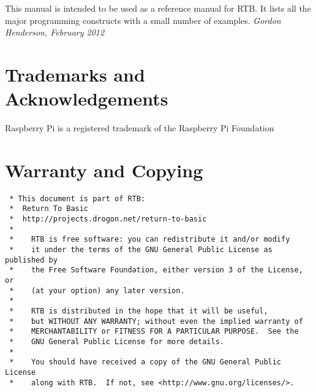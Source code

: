 This manual is intended to be used as a reference manual for RTB. It
lists all the major programming constructs with a small number of examples.
\vfill
{\hfill\em Gordon Henderson, February 2012}
\newpage
{}
\section*{Trademarks and Acknowledgements}
Raspberry Pi is a registered trademark of the Raspberry Pi Foundation


\section*{Warranty and Copying}
\begin{verbatim}
 * This document is part of RTB:
 *	Return To Basic
 *	http://projects.drogon.net/return-to-basic
 *
 *    RTB is free software: you can redistribute it and/or modify
 *    it under the terms of the GNU General Public License as published by
 *    the Free Software Foundation, either version 3 of the License, or
 *    (at your option) any later version.
 *
 *    RTB is distributed in the hope that it will be useful,
 *    but WITHOUT ANY WARRANTY; without even the implied warranty of
 *    MERCHANTABILITY or FITNESS FOR A PARTICULAR PURPOSE.  See the
 *    GNU General Public License for more details.
 *
 *    You should have received a copy of the GNU General Public License
 *    along with RTB.  If not, see <http://www.gnu.org/licenses/>.
\end{verbatim}

